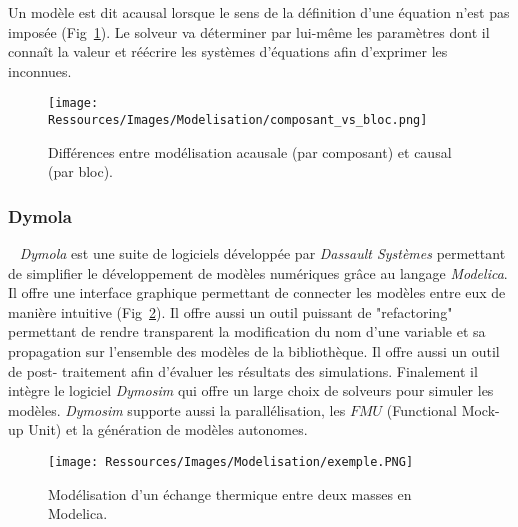 \begin{Def}[Acausale]\label{def:acausal}
Un modèle est dit acausal lorsque le sens de la définition d’une équation n’est pas
imposée (Fig~\ref{fig:acausal_vs_causal}). Le solveur va déterminer par lui-même les
paramètres dont il connaît la valeur et réécrire les systèmes d’équations afin d’exprimer
les inconnues.
\end{Def}

\begin{figure}
    \begin{center}
        \texttt{[image: Ressources/Images/Modelisation/composant\_vs\_bloc.png]}
    \end{center}
    \caption{Différences entre modélisation acausale (par composant) et causal (par bloc).
             \label{fig:acausal_vs_causal}}
\end{figure}

\subsubsection{Dymola} %
\label{ssub:dymola}
~
\textit{Dymola} est une suite de logiciels développée par \textit{Dassault Systèmes}
permettant de simplifier le développement de modèles numériques grâce au langage
\textit{Modelica}. Il offre une interface graphique permettant de connecter les modèles
entre eux de manière intuitive (Fig~\ref{fig:exemple_modelica}). Il offre aussi un outil
puissant de "refactoring" permettant de rendre transparent la modification du nom d’une
variable et sa propagation sur l’ensemble des modèles de la bibliothèque. Il offre aussi
un outil de post- traitement afin d’évaluer les résultats des simulations. Finalement il
intègre le logiciel \textit{Dymosim} qui offre un large choix de solveurs pour simuler les
modèles. \textit{Dymosim} supporte aussi la parallélisation, les $FMU$
(Functional Mock-up Unit) et la génération de modèles autonomes.
\begin{figure}
    \begin{center}
        \texttt{[image: Ressources/Images/Modelisation/exemple.PNG]}
    \end{center}
    \caption{Modélisation d’un échange thermique entre deux masses en Modelica.
             \label{fig:exemple_modelica}}
\end{figure}




